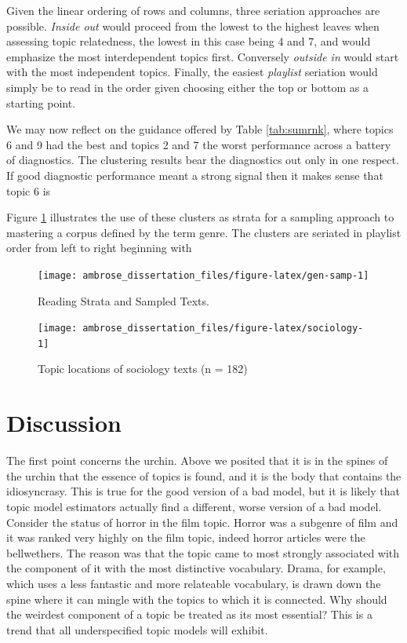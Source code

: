 \documentclass[]{book}
\theoremstyle{definition}
\theoremstyle{definition}
\theoremstyle{definition}
\theoremstyle{remark}
\begin{document}
Given the linear ordering of rows and columns, three seriation
approaches are possible. \emph{Inside out} would proceed from the lowest
to the highest leaves when assessing topic relatedness, the lowest in
this case being 4 and 7, and would emphasize the most interdependent
topics first. Conversely \emph{outside in} would start with the most
independent topics. Finally, the easiest \emph{playlist} seriation would
simply be to read in the order given choosing either the top or bottom
as a starting point.

We may now reflect on the guidance offered by Table \ref{tab:sumrnk},
where topics 6 and 9 had the best and topics 2 and 7 the worst
performance across a battery of diagnostics. The clustering results bear
the diagnostics out only in one respect. If good diagnostic performance
meant a strong signal then it makes sense that topic 6 is

Figure \ref{fig:gen-samp} illustrates the use of these clusters as
strata for a sampling approach to mastering a corpus defined by the term
genre. The clusters are seriated in playlist order from left to right
beginning with

\begin{figure}

{\centering \texttt{[image: ambrose\_dissertation\_files/figure-latex/gen-samp-1]} 

}

\caption{Reading Strata and Sampled Texts.}\label{fig:gen-samp}
\end{figure}

\begin{figure}

{\centering \texttt{[image: ambrose\_dissertation\_files/figure-latex/sociology-1]} 

}

\caption{Topic locations of sociology texts (n = 182)}\label{fig:sociology}
\end{figure}

\hypertarget{discussion-1}{%
\section{Discussion}\label{discussion-1}}

The first point concerns the urchin. Above we posited that it is in the
spines of the urchin that the essence of topics is found, and it is the
body that contains the idiosyncrasy. This is true for the good version
of a bad model, but it is likely that topic model estimators actually
find a different, worse version of a bad model. Consider the status of
horror in the film topic. Horror was a subgenre of film and it was
ranked very highly on the film topic, indeed horror articles were the
bellwethers. The reason was that the topic came to most strongly
associated with the component of it with the most distinctive
vocabulary. Drama, for example, which uses a less fantastic and more
relateable vocabulary, is drawn down the spine where it can mingle with
the topics to which it is connected. Why should the weirdest component
of a topic be treated as its most essential? This is a trend that all
underspecified topic models will exhibit.
\end{document}

